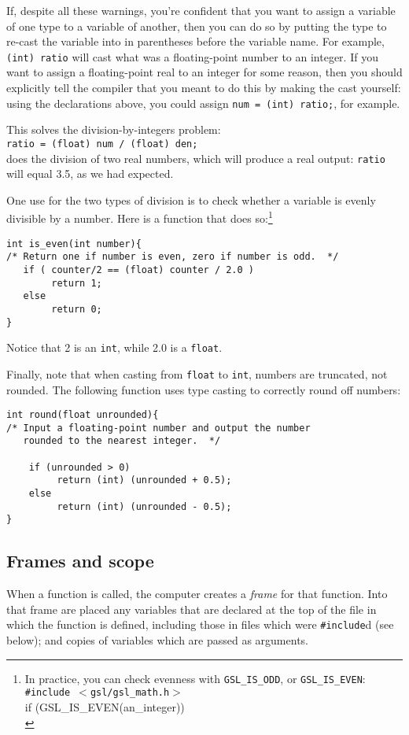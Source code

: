 \documentclass[12pt]{article}
\begin{document}
If, despite all these warnings, you're confident that you want to assign a variable of one type
to a variable of another, then you can do so by putting the type to
re-cast the variable into in parentheses before the variable name. For
example, {\tt (int) ratio} will cast what was a floating-point number to an integer. 
If you want to assign a floating-point real to an integer for some reason, then you should explicitly tell
the compiler that you meant to do this by making the cast yourself: using the declarations above, 
you could assign {\tt num = (int) ratio;}, for example. 

This solves the division-by-integers problem: \\
{\tt ratio = (float) num / (float) den;}\\
does the division of two real numbers, which will produce a real output: {\tt ratio} will equal 3.5, as we
had expected.


One use for the two types of division is to check whether a variable is evenly divisible by a number. Here
is a function that does so:\footnote{In practice, you can check evenness
with {\tt GSL\_IS\_ODD}, or {\tt GSL\_IS\_EVEN}:\\ 
{\tt \#include $<$gsl/gsl\_math.h$>$}\\
if (GSL\_IS\_EVEN(an\_integer))\\
\phantom{hello.}{\tt do\_something();}
}

\begin{verbatim}
int is_even(int number){
/* Return one if number is even, zero if number is odd.  */
   if ( counter/2 == (float) counter / 2.0 )
        return 1;
   else 
        return 0;
}
\end{verbatim}
Notice that 2 is an {\tt int}, while 2.0 is a {\tt float}.

Finally, note that when casting from {\tt float} to {\tt int}, numbers
are truncated, not rounded.  The following function uses type casting
to correctly round off numbers:

\begin{verbatim}
int round(float unrounded){
/* Input a floating-point number and output the number
   rounded to the nearest integer.  */

    if (unrounded > 0)
         return (int) (unrounded + 0.5);
    else
         return (int) (unrounded - 0.5);
}
\end{verbatim}



\subsection{Frames and scope}  
When a function is called, the computer creates a
{\sl frame} for that function. Into that frame are placed any variables
that are declared at the top of the file in which the function is defined,
including those in files which were {\tt \#include}d (see below); and copies of
variables which are passed as arguments. 
\end{document}
